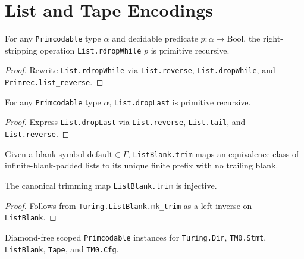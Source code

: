 \chapter{List and Tape Encodings}

\begin{lemma}
  \label{lem:list_rdropWhile}
  \leanok
  For any \texttt{Primcodable} type $\alpha$ and decidable predicate $p : \alpha \to \mathrm{Bool}$, the right-stripping operation \texttt{List.rdropWhile} $p$ is primitive recursive.
\end{lemma}
\begin{proof}
  \leanok
  Rewrite \texttt{List.rdropWhile} via \texttt{List.reverse}, \texttt{List.dropWhile}, and \texttt{Primrec.list\_reverse}.
\end{proof}

\begin{lemma}
  \label{lem:list_dropLast}
  \leanok
  For any \texttt{Primcodable} type $\alpha$, \texttt{List.dropLast} is primitive recursive.
\end{lemma}
\begin{proof}
  \leanok
  Express \texttt{List.dropLast} via \texttt{List.reverse}, \texttt{List.tail}, and \texttt{List.reverse}.
\end{proof}

\begin{definition}
  \label{def:listBlank_trim}
  \leanok
  Given a blank symbol $\mathrm{default} \in \Gamma$, \texttt{ListBlank.trim} maps an equivalence class of infinite-blank-padded lists to its unique finite prefix with no trailing blank.
\end{definition}

\begin{lemma}
  \label{lem:listBlank_trim_inj}
  \leanok
  The canonical trimming map \texttt{ListBlank.trim} is injective.
\end{lemma}
\begin{proof}
  \leanok
  Follows from \texttt{Turing.ListBlank.mk\_trim} as a left inverse on \texttt{ListBlank}.
\end{proof}

\begin{definition}
  \label{def:primcodable_tm0}
  \leanok
  Diamond-free scoped \texttt{Primcodable} instances for \texttt{Turing.Dir}, \texttt{TM0.Stmt}, \texttt{ListBlank}, \texttt{Tape}, and \texttt{TM0.Cfg}.
\end{definition}

